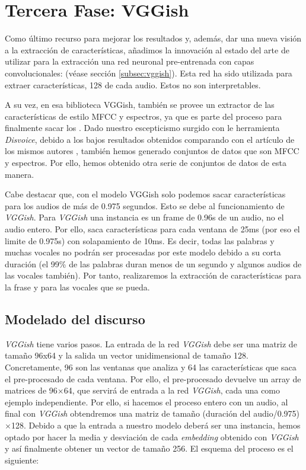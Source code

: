 \section{Tercera Fase: VGGish} \label{sec:fase3}
Como último recurso para mejorar los resultados y, además, dar una nueva visión a la extracción de características, añadimos la innovación al estado del arte de utilizar para la extracción una red neuronal pre-entrenada con capas convolucionales:  (véase sección \ref{subsec:vggish}). Esta red ha sido utilizada para extraer características, 128  de cada audio. Estos  no son interpretables. 

A su vez, en esa biblioteca VGGish, también se provee un extractor de las características de estilo MFCC y espectros, ya que es parte del proceso para finalmente sacar los . Dado nuestro escepticismo surgido con le herramienta \textit{Disvoice}, debido a los bajos resultados obtenidos comparando con el artículo de los mismos autores \cite{Orz2016}, también hemos generado conjuntos de datos que son MFCC y espectros. Por ello, hemos obtenido otra serie de conjuntos de datos de esta manera.

Cabe destacar que, con el modelo VGGish solo podemos sacar características para los audios de más de 0.975 segundos. Esto se debe al funcionamiento de \textit{VGGish}. Para \textit{VGGish} una instancia es un frame de 0.96s de un audio, no el audio entero. Por ello, saca características para cada ventana de 25ms (por eso el limite de 0.975s) con solapamiento de 10ms. Es decir, todas las palabras y muchas vocales no podrán ser procesadas por este modelo debido a su corta duración (el 99\% de las palabras duran menos de un segundo y algunos audios de las vocales también). Por tanto, realizaremos la extracción de características para la frase y para las vocales que se pueda.


\subsection{Modelado del discurso}
\textit{VGGish} tiene varios pasos. La entrada de la red \textit{VGGish} debe ser una matriz de tamaño 96x64 y la salida un vector unidimensional de tamaño 128. Concretamente, 96 son las ventanas que analiza y 64 las características que saca el pre-procesado de cada ventana. Por ello, el pre-procesado devuelve un array de matrices de 96$\times$64, que servirá de entrada a la red \textit{VGGish}, cada una como ejemplo independiente. Por ello, si hacemos el proceso entero con un audio, al final con \textit{VGGish} obtendremos una matriz de tamaño (duración del audio/0.975)$\times$128. Debido a que la entrada a nuestro modelo deberá ser una instancia, hemos optado por hacer la media y desviación de cada \textit{embedding} obtenido con \textit{VGGish} y así finalmente obtener un vector de tamaño 256. El esquema del proceso es el siguiente:

